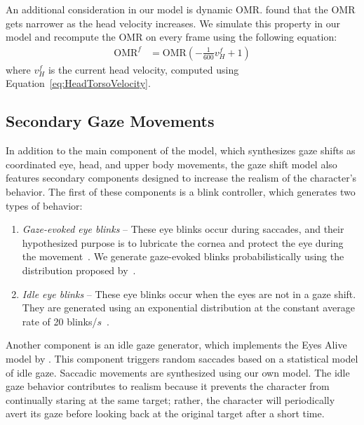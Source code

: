 An additional consideration in our model is dynamic OMR. \citet{guitton1987gaze} found that the OMR gets narrower as the head velocity increases. We simulate this property in our model and recompute the OMR on every frame using the following equation:
%
\begin{align} \label{eq:OMRUpdate}
\mathrm{OMR}^f &= \mathrm{OMR} (-\frac{1}{600} v^f_H + 1)
\end{align}
%
where $v^f_H$ is the current head velocity, computed using Equation~\ref{eq:HeadTorsoVelocity}.

\subsection{Secondary Gaze Movements}
\label{sec:GazeShiftSecondary}

In addition to the main component of the model, which synthesizes gaze shifts as coordinated eye, head, and upper body movements, the gaze shift model also features secondary components designed to increase the realism of the character's behavior. The first of these components is a blink controller, which generates two types of behavior:

\begin{enumerate}
\item \emph{Gaze-evoked eye blinks} -- These eye blinks occur during saccades, and their hypothesized purpose is to lubricate the cornea and protect the eye during the movement~\citep{evinger1994lookleap}. We generate gaze-evoked blinks probabilistically using the distribution proposed by~\citet{peters2010animating}.
\item \emph{Idle eye blinks} -- These eye blinks occur when the eyes are not in a gaze shift. They are generated using an exponential distribution at the constant average rate of 20 blinks/$s$~\citep{bentivoglio1997blinkrate}.
\end{enumerate}

Another component is an idle gaze generator, which implements the Eyes Alive model by \citet{lee2002eyes}. This component triggers random saccades based on a statistical model of idle gaze. Saccadic movements are synthesized using our own model. The idle gaze behavior contributes to realism because it prevents the character from continually staring at the same target; rather, the character will periodically avert its gaze before looking back at the original target after a short time. 